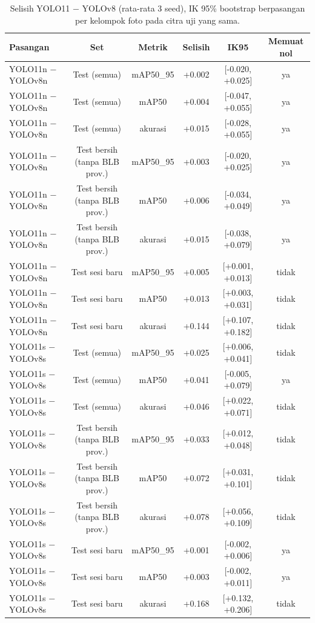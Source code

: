 \begin{table}[!t]
\centering
\caption{Selisih YOLO11 − YOLOv8 (rata-rata 3 seed), IK 95\% bootstrap berpasangan per kelompok foto pada citra uji yang sama.}
\label{tab:v8_vs_v11}
\footnotesize
\begin{tabular}{lccccc}
\hline
\textbf{Pasangan} & \textbf{Set} & \textbf{Metrik} & \textbf{Selisih} & \textbf{IK95} & \textbf{Memuat nol} \\
\hline
YOLO11n − YOLOv8n & Test (semua) & mAP50\_95 & +0.002 & [-0.020, +0.025] & ya \\
YOLO11n − YOLOv8n & Test (semua) & mAP50 & +0.004 & [-0.047, +0.055] & ya \\
YOLO11n − YOLOv8n & Test (semua) & akurasi & +0.015 & [-0.028, +0.055] & ya \\
YOLO11n − YOLOv8n & Test bersih (tanpa BLB prov.) & mAP50\_95 & +0.003 & [-0.020, +0.025] & ya \\
YOLO11n − YOLOv8n & Test bersih (tanpa BLB prov.) & mAP50 & +0.006 & [-0.034, +0.049] & ya \\
YOLO11n − YOLOv8n & Test bersih (tanpa BLB prov.) & akurasi & +0.015 & [-0.038, +0.079] & ya \\
YOLO11n − YOLOv8n & Test sesi baru & mAP50\_95 & +0.005 & [+0.001, +0.013] & tidak \\
YOLO11n − YOLOv8n & Test sesi baru & mAP50 & +0.013 & [+0.003, +0.031] & tidak \\
YOLO11n − YOLOv8n & Test sesi baru & akurasi & +0.144 & [+0.107, +0.182] & tidak \\
YOLO11s − YOLOv8s & Test (semua) & mAP50\_95 & +0.025 & [+0.006, +0.041] & tidak \\
YOLO11s − YOLOv8s & Test (semua) & mAP50 & +0.041 & [-0.005, +0.079] & ya \\
YOLO11s − YOLOv8s & Test (semua) & akurasi & +0.046 & [+0.022, +0.071] & tidak \\
YOLO11s − YOLOv8s & Test bersih (tanpa BLB prov.) & mAP50\_95 & +0.033 & [+0.012, +0.048] & tidak \\
YOLO11s − YOLOv8s & Test bersih (tanpa BLB prov.) & mAP50 & +0.072 & [+0.031, +0.101] & tidak \\
YOLO11s − YOLOv8s & Test bersih (tanpa BLB prov.) & akurasi & +0.078 & [+0.056, +0.109] & tidak \\
YOLO11s − YOLOv8s & Test sesi baru & mAP50\_95 & +0.001 & [-0.002, +0.006] & ya \\
YOLO11s − YOLOv8s & Test sesi baru & mAP50 & +0.003 & [-0.002, +0.011] & ya \\
YOLO11s − YOLOv8s & Test sesi baru & akurasi & +0.168 & [+0.132, +0.206] & tidak \\
\hline
\end{tabular}
\end{table}

